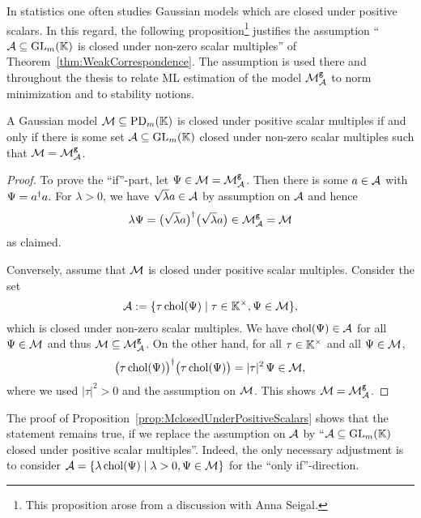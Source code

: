 
In statistics one often studies Gaussian models which are closed under positive scalars.
In this regard, the following proposition\footnote{This proposition arose from a discussion with Anna Seigal.} justifies the assumption ``$\mathcal{A} \subseteq \operatorname{GL}_m(\mathbb K)$ is closed under non-zero scalar multiples'' of Theorem~\ref{thm:WeakCorrespondence}. The assumption is used there and throughout the thesis to relate ML estimation of the model $\mathcal{M}^{\mathtt{g}}_{\mathcal{A}}$ to norm minimization and to stability notions.


\begin{prop}\label{prop:MclosedUnderPositiveScalars}
	A Gaussian model $\mathcal{M} \subseteq \operatorname{PD}_m(\mathbb K)$ is closed under positive scalar multiples if and only if there is some set $\mathcal{A} \subseteq \operatorname{GL}_m(\mathbb K)$ closed under non-zero scalar multiples such that $\mathcal{M} = \mathcal{M}^{\mathtt{g}}_{\mathcal{A}}$.
\end{prop}

\begin{proof}
	To prove the ``if''-part, let $\Psi \in \mathcal{M} = \mathcal{M}^{\mathtt{g}}_{\mathcal{A}}$. Then there is some $a \in \mathcal{A}$ with $\Psi = a^{\dagger} a$. For $\lambda > 0$, we have $\sqrt{\lambda}a \in \mathcal{A}$ by assumption on $\mathcal{A}$ and hence
	\[\lambda \Psi = \big(\sqrt{\lambda} a \big)^{\dagger} \big( \sqrt{\lambda}a \big) \in \mathcal{M}^{\mathtt{g}}_{\mathcal{A}} = \mathcal{M} \]
	as claimed.
	
	Conversely, assume that $\mathcal{M}$ is closed under positive scalar multiples. Consider the set
	\[ \mathcal{A} := \{ \tau \operatorname{chol}(\Psi) \mid \tau \in \mathbb K^{\times}, \Psi \in \mathcal{M} \}, \]
	which is closed under non-zero scalar multiples. We have $\operatorname{chol}(\Psi) \in \mathcal{A}$ for all $\Psi \in \mathcal{M}$ and thus $\mathcal{M} \subseteq \mathcal{M}^{\mathtt{g}}_{\mathcal{A}}$. On the other hand, for all $\tau \in \mathbb K^{\times}$ and all $\Psi \in \mathcal{M}$,
	\[ \big( \tau \operatorname{chol}(\Psi) \big)^{\dagger} \big( \tau \operatorname{chol}(\Psi) \big) = |\tau|^2 \, \Psi \in \mathcal{M}, \]
	where we used  $|\tau|^2 > 0$ and the assumption on $\mathcal{M}$. This shows $\mathcal{M} = \mathcal{M}^{\mathtt{g}}_{\mathcal{A}}$.
\end{proof}

\begin{remark}
	The proof of Proposition~\ref{prop:MclosedUnderPositiveScalars} shows that the statement remains true, if we replace the assumption on $\mathcal{A}$ by ``$\mathcal{A} \subseteq \operatorname{GL}_m(\mathbb K)$ closed under positive scalar multiples''. Indeed, the only necessary adjustment is to consider $\mathcal{A} = \{\lambda \operatorname{chol}(\Psi) \mid \lambda >0, \Psi \in \mathcal{M}\}$ for the ``only if''-direction.
	\hfill\remSymbol
\end{remark}




